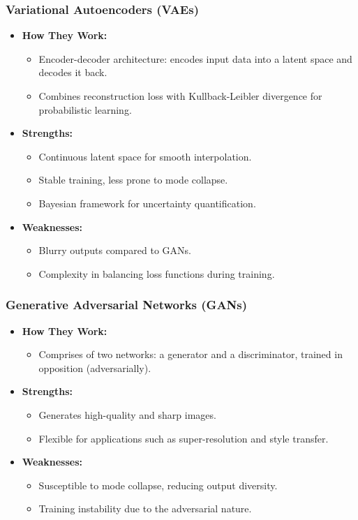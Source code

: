 \documentclass[aspectratio=169]{beamer}
\begin{document}
\begin{frame}[fragile]
    \frametitle{Variational Autoencoders (VAEs)}
    \begin{itemize}
        \item \textbf{How They Work:}
            \begin{itemize}
                \item Encoder-decoder architecture: encodes input data into a latent space and decodes it back.
                \item Combines reconstruction loss with Kullback-Leibler divergence for probabilistic learning.
            \end{itemize}
        \item \textbf{Strengths:}
            \begin{itemize}
                \item Continuous latent space for smooth interpolation.
                \item Stable training, less prone to mode collapse.
                \item Bayesian framework for uncertainty quantification.
            \end{itemize}
        \item \textbf{Weaknesses:}
            \begin{itemize}
                \item Blurry outputs compared to GANs.
                \item Complexity in balancing loss functions during training.
            \end{itemize}
    \end{itemize}
\end{frame}

\begin{frame}[fragile]
    \frametitle{Generative Adversarial Networks (GANs)}
    \begin{itemize}
        \item \textbf{How They Work:}
            \begin{itemize}
                \item Comprises of two networks: a generator and a discriminator, trained in opposition (adversarially).
            \end{itemize}
        \item \textbf{Strengths:}
            \begin{itemize}
                \item Generates high-quality and sharp images.
                \item Flexible for applications such as super-resolution and style transfer.
            \end{itemize}
        \item \textbf{Weaknesses:}
            \begin{itemize}
                \item Susceptible to mode collapse, reducing output diversity.
                \item Training instability due to the adversarial nature.
            \end{itemize}
    \end{itemize}
\end{frame}
\end{document}
